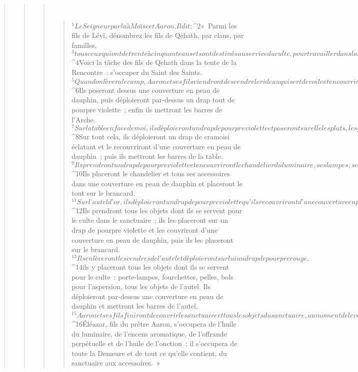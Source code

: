 \begin{verse}
\begin{verse}
\begin{verse}
         
      \bchapter{}
      \begin{verse}
${}^{1}Le Seigneur parla à Moïse et Aaron. Il dit : 
${}^{2}« Parmi les fils de Lévi, dénombrez les fils de Qehath, par clans, par familles, 
${}^{3}tous ceux qui ont de trente à cinquante ans et sont destinés au service du culte, pour travailler dans la tente de la Rencontre. 
${}^{4}Voici la tâche des fils de Qehath dans la tente de la Rencontre : s’occuper du Saint des Saints. 
${}^{5}Quand on lèvera le camp, Aaron et ses fils viendront descendre le rideau qui sert de voile et en couvriront l’arche du Témoignage. 
${}^{6}Ils poseront dessus une couverture en peau de dauphin, puis déploieront par-dessus un drap tout de pourpre violette ; enfin ils mettront les barres de l’Arche. 
${}^{7}Sur la table en face de moi, ils déploieront un drap de pourpre violette et poseront sur elle les plats, les gobelets, les timbales et les aiguières pour les libations ; là sera le pain perpétuel. 
${}^{8}Sur tout cela, ils déploieront un drap de cramoisi éclatant et le recouvriront d’une couverture en peau de dauphin ; puis ils mettront les barres de la table. 
${}^{9}Ils prendront un drap de pourpre violette et en couvriront le chandelier du luminaire, ses lampes, ses pincettes, ses porte-lampes et tous les vases d’huile qu’ils utilisent pour le culte. 
${}^{10}Ils placeront le chandelier et tous ses accessoires dans une couverture en peau de dauphin et placeront le tout sur le brancard. 
${}^{11}Sur l’autel d’or, ils déploieront un drap de pourpre violette qu’ils recouvriront d’une couverture en peau de dauphin ; puis ils mettront les barres de l’autel. 
${}^{12}Ils prendront tous les objets dont ils se servent pour le culte dans le sanctuaire ; ils les placeront sur un drap de pourpre violette et les couvriront d’une couverture en peau de dauphin, puis ils les placeront sur le brancard. 
${}^{13}Ils enlèveront les cendres de l’autel et déploieront sur lui un drap de pourpre rouge, 
${}^{14}ils y placeront tous les objets dont ils se servent pour le culte : porte-lampes, fourchettes, pelles, bols pour l’aspersion, tous les objets de l’autel. Ils déploieront par-dessus une couverture en peau de dauphin et mettront les barres de l’autel. 
${}^{15}Aaron et ses fils finiront de couvrir le sanctuaire et tous les objets du sanctuaire, au moment de lever le camp. Ensuite viendront les fils de Qehath pour le transport, mais ils ne toucheront pas au sanctuaire car ils mourraient. Telle est donc la charge des fils de Qehath dans la tente de la Rencontre. 
${}^{16}Éléazar, fils du prêtre Aaron, s’occupera de l’huile du luminaire, de l’encens aromatique, de l’offrande perpétuelle et de l’huile de l’onction ; il s’occupera de toute la Demeure et de tout ce qu’elle contient, du sanctuaire aux accessoires. »

\end{verse}
\end{verse}
\end{verse}
\end{verse}
